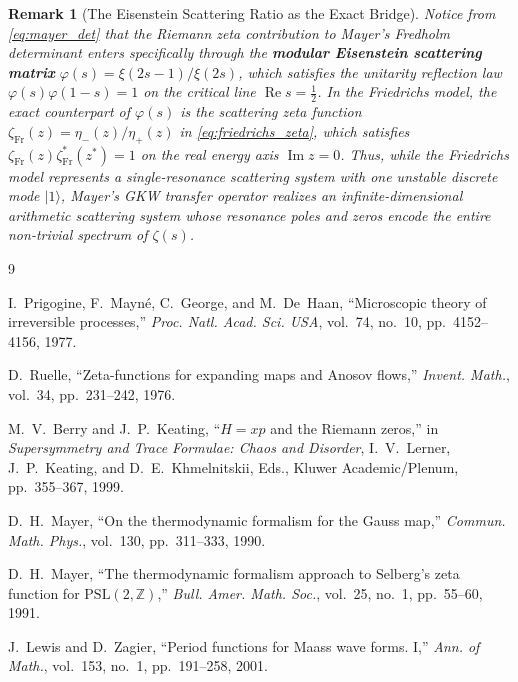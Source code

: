 \documentclass[11pt,a4paper]{article}
\newtheorem{remark}[theorem]{Remark}
\newcommand{\Real}{\operatorname{Re}}
\newcommand{\Imag}{\operatorname{Im}}
\begin{document}
\begin{remark}[The Eisenstein Scattering Ratio as the Exact Bridge]
Notice from \eqref{eq:mayer_det} that the Riemann zeta contribution to Mayer's Fredholm determinant enters specifically through the \textbf{modular Eisenstein scattering matrix} $\varphi(s) = \xi(2s-1)/\xi(2s)$, which satisfies the unitarity reflection law $\varphi(s)\varphi(1-s) = 1$ on the critical line $\Real s = \frac{1}{2}$. In the Friedrichs model, the exact counterpart of $\varphi(s)$ is the scattering zeta function $\zeta_{\mathrm{Fr}}(z) = \eta_-(z)/\eta_+(z)$ in \eqref{eq:friedrichs_zeta}, which satisfies $\zeta_{\mathrm{Fr}}(z)\zeta_{\mathrm{Fr}}^*(z^*) = 1$ on the real energy axis $\Imag z = 0$. Thus, while the Friedrichs model represents a \emph{single-resonance} scattering system with one unstable discrete mode $\lvert 1\rangle$, Mayer's GKW transfer operator realizes an \emph{infinite-dimensional arithmetic scattering system} whose resonance poles and zeros encode the entire non-trivial spectrum of $\zeta(s)$.
\end{remark}

\begin{thebibliography}{9}

I.~Prigogine, F.~Mayn\'e, C.~George, and M.~De~Haan, ``Microscopic theory of irreversible processes,'' \emph{Proc. Natl. Acad. Sci. USA}, vol.~74, no.~10, pp.~4152--4156, 1977.

D.~Ruelle, ``Zeta-functions for expanding maps and Anosov flows,'' \emph{Invent. Math.}, vol.~34, pp.~231--242, 1976.

M.~V.~Berry and J.~P.~Keating, ``$H = xp$ and the Riemann zeros,'' in \emph{Supersymmetry and Trace Formulae: Chaos and Disorder}, I.~V.~Lerner, J.~P.~Keating, and D.~E.~Khmelnitskii, Eds., Kluwer Academic/Plenum, pp.~355--367, 1999.

D.~H.~Mayer, ``On the thermodynamic formalism for the Gauss map,'' \emph{Commun. Math. Phys.}, vol.~130, pp.~311--333, 1990.

D.~H.~Mayer, ``The thermodynamic formalism approach to Selberg's zeta function for $\mathrm{PSL}(2,\mathbb{Z})$,'' \emph{Bull. Amer. Math. Soc.}, vol.~25, no.~1, pp.~55--60, 1991.

J.~Lewis and D.~Zagier, ``Period functions for Maass wave forms. I,'' \emph{Ann. of Math.}, vol.~153, no.~1, pp.~191--258, 2001.

\end{thebibliography}
\end{document}
